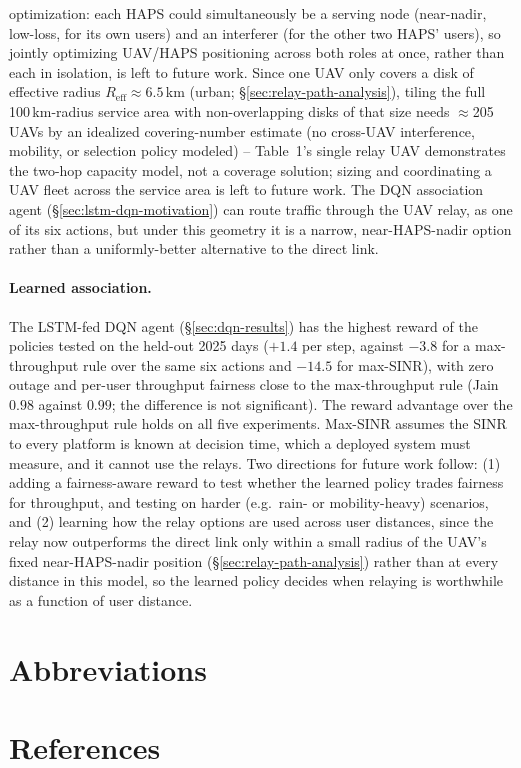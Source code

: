 \documentclass[conference]{IEEEtran}
\begin{document}
optimization: each HAPS could simultaneously be a serving node (near-nadir,
low-loss, for its own users) and an interferer (for the other two HAPS'
users), so jointly optimizing UAV/HAPS positioning across both roles at
once, rather than each in isolation, is left to future work. Since one UAV only covers a
disk of effective radius $R_{\text{eff}}\approx6.5$\,km (urban; \S\ref{sec:relay-path-analysis}),
tiling the full 100\,km-radius service area with non-overlapping disks of that size needs
$\approx$205 UAVs by an idealized covering-number estimate (no cross-UAV interference,
mobility, or selection policy modeled) -- Table~1's single relay UAV demonstrates the
two-hop capacity model, not a coverage solution; sizing and coordinating a UAV fleet across
the service area is left to future work.
The DQN association agent (\S\ref{sec:lstm-dqn-motivation}) can route traffic through the UAV relay, as one of its six actions, but under this geometry it is a narrow, near-HAPS-nadir option rather than a uniformly-better alternative to the direct link.

\paragraph{Learned association.} The LSTM-fed DQN agent (\S\ref{sec:dqn-results}) has the highest reward of the policies tested on the held-out 2025 days ($+1.4$ per step, against $-3.8$ for a max-throughput rule over the same six actions and $-14.5$ for max-SINR), with zero outage and per-user throughput fairness close to the max-throughput rule (Jain $0.98$ against $0.99$; the difference is not significant). The reward advantage over the max-throughput rule holds on all five experiments. Max-SINR assumes the SINR to every platform is known at decision time, which a deployed system must measure, and it cannot use the relays. Two
directions for future work follow: (1) adding a fairness-aware reward to test whether the learned policy trades fairness for throughput, and testing on harder (e.g.\ rain- or
mobility-heavy) scenarios, and (2) learning how the relay options are used across user distances, since the relay now outperforms the direct link only within a small radius of the UAV's fixed near-HAPS-nadir position (\S\ref{sec:relay-path-analysis}) rather than at every
distance in this model, so the learned
policy decides when relaying is
worthwhile as a function of user distance.

\section{Abbreviations}



\section{References}



\onecolumn
\appendix





\end{document}

